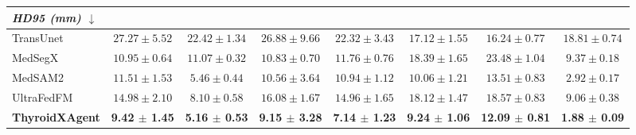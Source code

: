 \begin{table}[p]
\begin{threeparttable}
\begin{tabular}{lccccccc}
\midrule
\multicolumn{8}{l}{\textit{HD95 (mm) $\downarrow$}} \\
\midrule
TransUnet~\cite{chen2024transunet}
& $27.27 \pm 5.52$
& $22.42 \pm 1.34$
& $26.88 \pm 9.66$
& $22.32 \pm 3.43$
& $17.12 \pm 1.55$
& $16.24 \pm 0.77$
& $18.81 \pm 0.74$ \\
MedSegX~\cite{zhang2025generalist}
& $10.95 \pm 0.64$
& $11.07 \pm 0.32$
& $10.83 \pm 0.70$
& $11.76 \pm 0.76$
& $18.39 \pm 1.65$
& $23.48 \pm 1.04$
& $9.37 \pm 0.18$ \\
MedSAM2~\cite{ma2025medsam2}
& $11.51 \pm 1.53$
& $5.46 \pm 0.44$
& $10.56 \pm 3.64$
& $10.94 \pm 1.12$
& $10.06 \pm 1.21$
& $13.51 \pm 0.83$
& $2.92 \pm 0.17$ \\
UltraFedFM~\cite{jiang2025pretraining}
& $14.98 \pm 2.10$
& $8.10 \pm 0.58$
& $16.08 \pm 1.67$
& $14.96 \pm 1.65$
& $18.12 \pm 1.47$
& $18.57 \pm 0.83$
& $9.06 \pm 0.38$ \\
\rowcolor{lightgray}
\textbf{ThyroidXAgent}
& \textbf{9.42 $\pm$ 1.45}
& \textbf{5.16 $\pm$ 0.53}
& \textbf{9.15 $\pm$ 3.28}
& \textbf{7.14 $\pm$ 1.23}
& \textbf{9.24 $\pm$ 1.06}
& \textbf{12.09 $\pm$ 0.81}
& \textbf{1.88 $\pm$ 0.09} \\

\bottomrule
\end{tabular}
\end{threeparttable}
\end{table}

\clearpage

